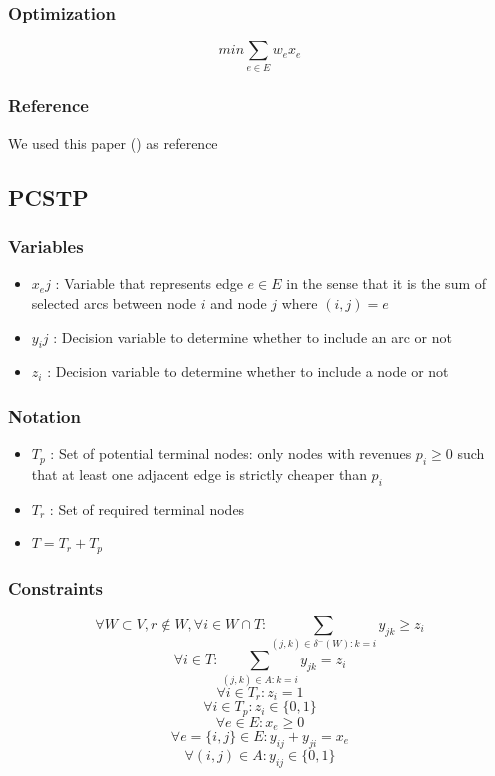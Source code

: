 \documentclass{article}
\begin{document}
\subsubsection{Optimization}
\[ min \sum_{e\in E}w_ex_e \]

\subsubsection{Reference}
We used this paper (\cite{solving_steiner_tree_problems}) as reference

\subsection{PCSTP}

\subsubsection{Variables}
\begin{itemize}
	\item $x_ej$ : Variable that represents edge $e \in E$ in the sense that it is the sum of selected arcs between node $i$ and node $j$ where $(i,j) = e$ 
	\item $y_ij$ : Decision variable to determine whether to include an arc or not
	\item $z_i$ : Decision variable to determine whether to include a node or not
\end{itemize}

\subsubsection{Notation}
\begin{itemize}
	\item $T_p$ : Set of potential terminal nodes: only nodes with revenues
	$p_i \ge 0$ such that at least one adjacent edge is strictly cheaper than $p_i$
	\item $T_r$ : Set of required terminal nodes
	\item $T = T_r + T_p$
\end{itemize}


\subsubsection{Constraints}

\[ \forall W \subset V, r \notin W, \forall i \in W \cap T : \sum_{(j,k)\in \delta^-(W):k=i}y_{jk} \geq z_i \]
\[ \forall i \in T : \sum_{(j,k)\in A:k=i}y_{jk} = z_i \]
\[ \forall i \in T_r : z_i = 1 \]
\[ \forall i \in T_p : z_i \in \{0,1\} \]
\[ \forall e \in E : x_e \geq 0 \]
\[ \forall e = \{i,j\} \in E : y_{ij} + y_{ji} = x_e \]
\[ \forall (i,j) \in A : y_{ij} \in \{0,1\} \]
\end{document}
